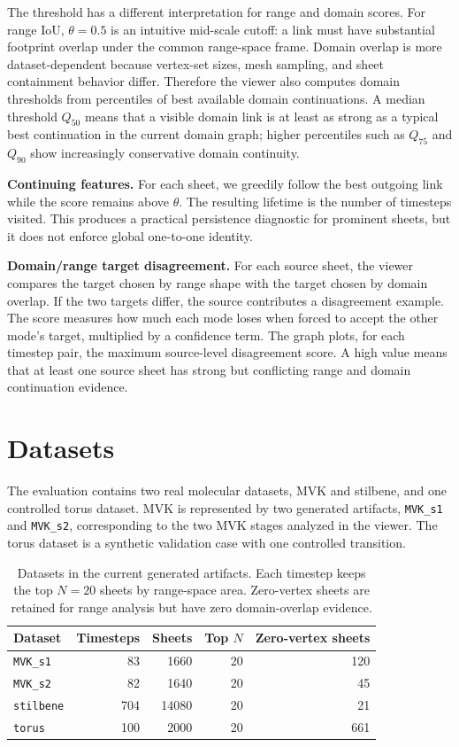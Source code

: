 \documentclass{vgtc}
\newcommand{\myparagraph}[1]{\vspace{1mm} \noindent \textbf{#1}}
\begin{document}
The threshold has a different interpretation for range and domain scores. For range IoU, $\theta=0.5$ is an intuitive mid-scale cutoff: a link must have substantial footprint overlap under the common range-space frame. Domain overlap is more dataset-dependent because vertex-set sizes, mesh sampling, and sheet containment behavior differ. Therefore the viewer also computes domain thresholds from percentiles of best available domain continuations. A median threshold $Q_{50}$ means that a visible domain link is at least as strong as a typical best continuation in the current domain graph; higher percentiles such as $Q_{75}$ and $Q_{90}$ show increasingly conservative domain continuity.

\myparagraph{Continuing features.}
For each sheet, we greedily follow the best outgoing link while the score remains above $\theta$. The resulting lifetime is the number of timesteps visited. This produces a practical persistence diagnostic for prominent sheets, but it does not enforce global one-to-one identity.

\myparagraph{Domain/range target disagreement.}
For each source sheet, the viewer compares the target chosen by range shape with the target chosen by domain overlap. If the two targets differ, the source contributes a disagreement example. The score measures how much each mode loses when forced to accept the other mode's target, multiplied by a confidence term. The graph plots, for each timestep pair, the maximum source-level disagreement score. A high value means that at least one source sheet has strong but conflicting range and domain continuation evidence.

\section{Datasets}

The evaluation contains two real molecular datasets, MVK and stilbene, and one controlled torus dataset. MVK is represented by two generated artifacts, \texttt{MVK\_s1} and \texttt{MVK\_s2}, corresponding to the two MVK stages analyzed in the viewer. The torus dataset is a synthetic validation case with one controlled transition.

\begin{table}[t]
  \centering
  \caption{Datasets in the current generated artifacts. Each timestep keeps the top $N=20$ sheets by range-space area. Zero-vertex sheets are retained for range analysis but have zero domain-overlap evidence.}
  \label{tab:datasets}
  \begin{tabular}{lrrrr}
    \toprule
    Dataset & Timesteps & Sheets & Top $N$ & Zero-vertex sheets \\
    \midrule
    \texttt{MVK\_s1} & 83 & 1660 & 20 & 120 \\
    \texttt{MVK\_s2} & 82 & 1640 & 20 & 45 \\
    \texttt{stilbene} & 704 & 14080 & 20 & 21 \\
    \texttt{torus} & 100 & 2000 & 20 & 661 \\
    \bottomrule
  \end{tabular}
\end{table}
\end{document}
